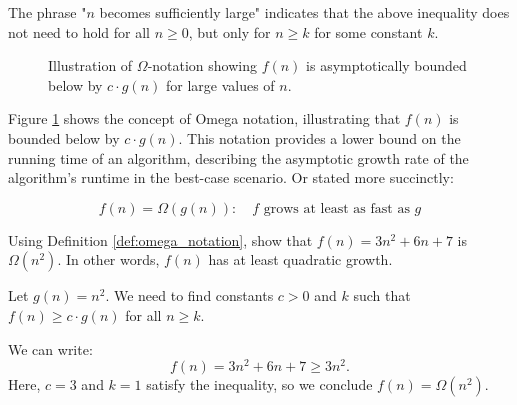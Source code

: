 The phrase "$n$ becomes sufficiently large" indicates that the above inequality does not need to hold for all $n \geq 0$, but only for $n \geq k$ for some constant $k$. 

\begin{figure}[h]
    \centering
    \caption{Illustration of \(\Omega\)-notation showing $f(n)$ is asymptotically bounded below by $c \cdot g(n)$ for large values of $n$.}
    \label{fig:omega_notation}
\end{figure}

Figure \ref{fig:omega_notation} shows the concept of Omega notation, illustrating that $f(n)$ is bounded below by $c \cdot g(n)$. This notation provides a lower bound on the running time of an algorithm, describing the asymptotic growth rate of the algorithm's runtime in the best-case scenario. Or stated more succinctly:

\[
f(n)=\Omega(g(n)): \quad f \text{ grows at least as fast as } g
\]


\begin{example}
    Using Definition \ref{def:omega_notation}, show that $f(n)=3n^2+6n+7$ is $\Omega(n^2)$. In other words, $f(n)$ has at least quadratic growth.
\end{example}

\begin{solution}
    Let $g(n) = n^2$. We need to find constants $c > 0$ and $k$ such that $f(n) \geq c \cdot g(n)$ for all $n \geq k$.

    We can write:
    \[
    f(n) = 3n^2 + 6n + 7 \geq 3n^2.
    \]
    Here, $c = 3$ and $k = 1$ satisfy the inequality, so we conclude $f(n) = \Omega(n^2)$.
\end{solution}


